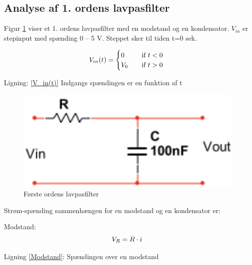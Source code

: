 \subsection{Analyse af 1. ordens lavpasfilter}
Figur \ref{lavpasfilter} viser et 1. ordens lavpasfilter med en modstand og en kondensator. $V_{in}$ er stepinput med spænding 0 – 5 V. Steppet sker til tiden t=0 sek.


\begin{equation}
 V_{in}(t) =
  \begin{cases}
    0 & \quad \text{if } t <0\\
    V_{0}&\quad \text{if } t >0\\
  \end{cases}
\label{V_in(t)}\\
\end{equation}
\begin{center}
Ligning: \ref{V_in(t)} Indgangs spændingen er en funktion af t
\end{center}


\begin{figure}[h]
\begin{center}
\includegraphics[height=5cm]{M_Fig/Ana_1_Ordens_Lavpasfilter}
\caption{Første ordens lavpasfilter}
\label{lavpasfilter}
\end{center}
\end{figure}

Strøm-spænding sammenhængen for en modstand og en kondensator er:


Modstand:
\begin{equation}
 V_{R} =R\cdot i
\label{Modstand}\\
\end{equation}
\begin{center}
Ligning \ref{Modstand}: Spændingen over en modstand
\end{center}


